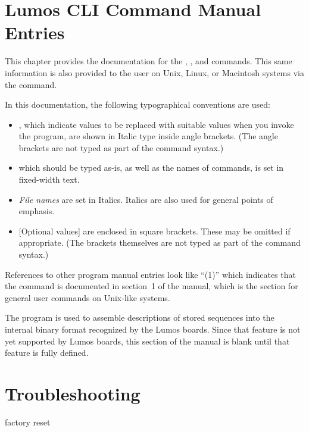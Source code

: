 \documentclass[letterpaper,twoside,onecolumn,openright,final]{memoir}
\begin{document}
\chapter{Lumos CLI Command Manual Entries}\label{ch:lumosctl}
This chapter provides the documentation for the , , and  commands.  
This same information is also
provided to the  user on Unix, Linux, or Macintosh systems via the  command.  

In this documentation, the following typographical conventions are used:
\begin{itemize}
	\item	{}, which indicate values to be replaced with suitable values when you
		invoke the program, are shown in Italic type inside angle brackets.  (The angle brackets
		are not typed as part of the command syntax.)
	\item	{} which should be typed as-is, as well as the names of commands, is set
		in fixed-width text.
	\item	\emph{File names} are set in Italics.  Italics are also used for general points of emphasis.
	\item	{}[Optional values] are enclosed in square brackets.  These may be omitted if appropriate.
		(The brackets themselves are not typed as part of the command syntax.)
\end{itemize}
References to other program manual entries look like ``(1)'' which indicates that the
 command is documented in section~1 of the manual, which is the section for general 
user commands on Unix-like systems.
\newpage
\begin{NotImplemented*}{The  program is used to assemble descriptions of stored
sequences into the internal binary format recognized by the Lumos boards.  Since that feature is
not yet supported by Lumos boards, this section of the manual is blank until that feature is
fully defined.}
%
\end{NotImplemented*}
\newpage

\newpage
\label{man:lumosupgrade}

\chapter{Troubleshooting}
factory reset
\end{document}
